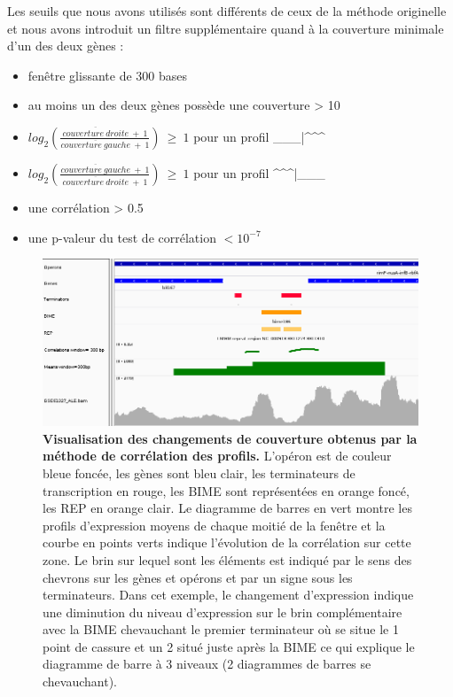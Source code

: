 \documentclass[12pt,a4paper]{report}
\begin{document}
\begin{onehalfspace}
Les seuils que nous avons utilisés sont différents de ceux de la méthode originelle et nous avons introduit un filtre supplémentaire quand à la couverture minimale d'un des deux gènes : 
\begin{itemize}[label=$\bullet$]
\item fenêtre glissante de 300 bases
\item au moins un des deux gènes possède une couverture > 10
\item $log_2(\frac{\overline{couverture~droite}~+~1}{\overline{couverture~gauche}~+~1})~\geq~1$ pour un profil \_\_\_|\^{ }\^{ }\^{ }
\item $log_2(\frac{\overline{couverture~gauche}~+~1}{\overline{couverture~droite}~+~1})~\geq~1$ pour un profil \^{ }\^{ }\^{ }|\_\_\_
\item une corrélation > 0.5
\item une p-valeur du test de corrélation $< 10^{-7}$
\end{itemize}

\begin{figure}[!h]
\centerline{\includegraphics[scale=0.55]{figures/igv_profil.png}}
\caption{\textbf{Visualisation des changements de couverture obtenus par la méthode de corrélation des profils.} L'opéron est de couleur bleue foncée, les gènes sont bleu clair, les terminateurs de transcription en rouge, les BIME sont représentées en orange foncé, les REP en orange clair. Le diagramme de barres en vert montre les profils d'expression moyens de chaque moitié de la fenêtre et la courbe en points verts indique l'évolution de la corrélation sur cette zone. Le brin sur lequel sont les éléments est indiqué par le sens des chevrons sur les gènes et opérons et par un signe sous les terminateurs. Dans cet exemple, le changement d'expression indique une diminution du niveau d'expression sur le brin complémentaire avec la BIME chevauchant le premier terminateur où se situe le 1 point de cassure et un 2 situé juste après la BIME ce qui explique le diagramme de barre à 3 niveaux (2 diagrammes de barres se chevauchant).}
\label{fig:igv_profil}
\end{figure}


\end{onehalfspace}
\end{document}

